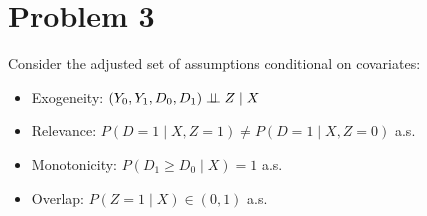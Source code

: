 \documentclass{article}
\begin{document}
\newpage
\section*{Problem 3}
Consider the adjusted set of assumptions conditional on covariates:
\begin{itemize}
    \item Exogeneity: $\left(Y_{0}, Y_{1}, D_{0}, D_{1}\right) \perp\!\!\!\perp Z \mid X$
    \item Relevance: $P(D=1 \mid X, Z=1) \neq P(D=1 \mid X, Z=0)$ a.s.
    \item Monotonicity: $P\left(D_{1} \geq D_{0} \mid X\right)=1$ a.s.
    \item Overlap: $P(Z=1 \mid X) \in(0,1)$ a.s.
\end{itemize}
\end{document}
